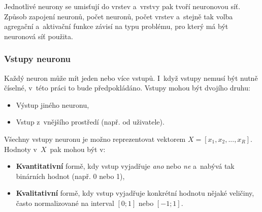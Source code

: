 \documentclass[a4paper,12pt]{article}
\begin{document}
{{{{

Jednotlivé neurony se umisťují do vrstev a~vrstvy pak tvoří neuronovou síť. Způsob zapojení neuronů, počet neuronů, počet vrstev a~stejně tak volba agregační a~aktivační funkce závisí na typu problému, pro který má být neuronová síť použita.


\subsubsection{Vstupy neuronu}

Každý neuron může mít jeden nebo více vstupů. I~když vstupy nemusí být nutně číselné, v~této práci to bude předpokládáno. Vstupy mohou být dvojího druhu:

\begin{itemize}
\item Výstup jiného neuronu,
\item Vstup z~vnějšího prostředí (např. od uživatele).
\end{itemize}

Všechny vstupy neuronu je možno reprezentovat vektorem $X = [{x_1, x_2, ..., x_R}]$. Hodnoty v~$X$~pak mohou být v:

\begin{itemize}
\item \textbf{Kvantitativní} formě, kdy vstup vyjadřuje \textit{ano} nebo \textit{ne} a~nabývá tak binárních hodnot (např. 0 nebo 1),
\item \textbf{Kvalitativní} formě, kdy vstup vyjadřuje konkrétní hodnotu nějaké veličiny, často normalizované na interval $[0; 1]$ nebo $[-1; 1]$.
\end{itemize}

}}}}
\end{document}
